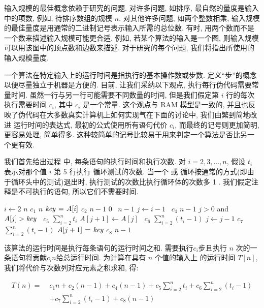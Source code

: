 \documentclass[oneside,10pt,fontset=none]{ctexbook}
\numberwithin{definition}{chapter}
\numberwithin{theorem}{chapter}
\numberwithin{proof}{chapter}
\begin{document}
输入规模的最佳概念依赖于研究的问题. 对许多问题, 如排序, 最自然的量度是输入中的项数, 例如, 待排序数组的规模 $n$. 对其他许多问题, 如两个整数相乘, 输入规模的最佳量度是用通常的二进制记号表示输入所需的总位数. 有时, 用两个数而不是一个数来描述输入规模可能更合适. 例如, 若某个算法的输入是一个图, 则输入规模可以用该图中的顶点数和边数来描述. 对于研究的每个问题, 我们将指出所使用的输入规模量度.

一个算法在特定输入上的运行时间是指执行的基本操作数或步数. 定义``步''的概念以便尽量独立于机器是方便的. 目前, 让我们采纳以下观点, 执行每行伪代码需要常量时间. 虽然一行与另一行可能需要不同数量的时间, 但是我们假定第 $i$ 行的每次执行需要时间 $c_i$, 其中 $c_i$ 是一个常量. 这个观点与 RAM 模型是一致的, 并且也反映了伪代码在大多数真实计算机上如何实现气在下面的讨论中, 我们由繁到简地改进 运行时间的表达式, 最初的公式使用所有语句代价 $c_i$, 而最终的记号则更加简明, 更容易处理, 简单得多. 这种较简单的记号比较易于用来判定一个算法是否比另一个更有效.

我们首先给出过程  中, 每条语句的执行时间和执行次数. 对 $i=2, 3, \dots, n$, 假设 $t_i$ 表示对那个值 $i$ 第 5 行执行  循环测试的次数. 当一个  或  循环按通常的方式(即由于循环头中的测试)退出时, 执行测试的次数比执行循环体的次数多 1 . 我们假定注释是不可执行的语旬, 所以它们不需要时间.

\newcommand{\myquad}[1][1]{\hspace*{#1em}\ignorespaces}
\begin{codebox}
\Procname{$\proc{Insertion-Sort}(A, n) \myquad[16] \text{代价}$ \quad \text{次数}}
\li \For $i \gets 2$ \To $n$ \myquad[18] $c_1$ \quad\quad $n$
\li \Do
$\id{key} \gets A[i]$ \myquad[17]\; $c_2$ \quad\quad $n-1$
\li {} \; $0$ \quad\quad\ $n-1$
\li $j \gets i-1$ \myquad[18]\ $c_4$ \quad\quad $n-1$
\li \While $j > 0$ and $A[j] > \id{key}$ \myquad[10]\ $c_5$ \quad\;\; $\sum_{i=2}^{n}t_i$
\li \Do
$A[j+1] \gets A[j]$ \myquad[13]\ $c_6$ \; $\sum_{i=2}^{n}(t_i-1)$
\li $j \gets j-1$ \myquad[16] $c_7$ \; $\sum_{i=2}^{n}(t_i-1)$
\End
\li $A[j+1] \gets \id{key}$ \myquad[16] $c_8$ \quad\quad $n-1$
\End
\end{codebox}

该算法的运行时间是执行每条语句的运行时间之和. 需要执行$c_i$步且执行 $n$ 次的一条语句将贡献$c_in$给总运行时间. 为计算在具有 $n$ 个值的输入上  的运行时间 $T[n]$, 我们将代价与次数列对应元素之积求和, 得:

\begin{equation*}\begin{split}
T(n) =\; &c_1n + c_2(n-1) + c_4(n-1) + c_5\sum_{i=2}^{n}t_i + c_6\sum_{i=2}^{n}(t_i-1) \\
&+c_7\sum_{i=2}^{n}(t_i-1) + c_8(n-1)
\end{split}\end{equation*}
\end{document}
